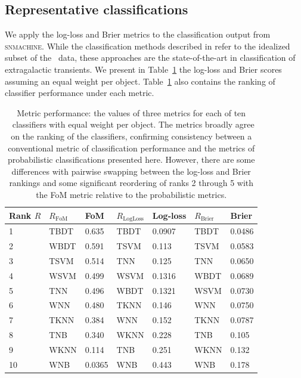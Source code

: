 \subsection{Representative classifications}
\label{sec:realresults}
We apply the log-loss and Brier metrics to the classification output from \textsc{snmachine}. While the classification methods described in \citet{lochner_photometric_2016} refer to the idealized subset of the \snphotcc\ data, these approaches are the state-of-the-art in classification of extragalactic transients. We present in Table~\ref{tab:snmachineresults} the log-loss and Brier scores assuming an equal weight per object. 
Table~\ref{tab:snmachineresults} also contains the ranking of classifier performance under each metric.


\begin{table}[]
	\begin{centering}
\begin{tabular}{lllllll}%
Rank $R$ & $R_\mathrm{FoM}$ & FoM & %
$R_\mathrm{LogLoss}$ & Log-loss & $R_\mathrm{Brier}$ & Brier \\
\hline
1  & TBDT & 0.635  %
& TBDT & 0.0907 & TBDT & 0.0486 \\
2  & WBDT & 0.591  %
& TSVM & 0.113  & TSVM & 0.0583 \\
3  & TSVM & 0.514  %
& TNN  & 0.125  & TNN  & 0.0650 \\
4  & WSVM & 0.499  %
& WSVM & 0.1316 & WBDT & 0.0689 \\
5  & TNN  & 0.496  %
& WBDT & 0.1321 & WSVM & 0.0730 \\
6  & WNN  & 0.480  %
& TKNN & 0.146  & WNN  & 0.0750 \\
7  & TKNN & 0.384  %
& WNN  & 0.152  & TKNN & 0.0787 \\
8  & TNB  & 0.340  %
& WKNN & 0.228  & TNB  & 0.105  \\
9  & WKNN & 0.114  %
& TNB  & 0.251  & WKNN & 0.132  \\
10 & WNB  & 0.0365 %
& WNB  & 0.443  & WNB  & 0.178  \\
\end{tabular}
	\caption{Metric performance: the values of three metrics for each of ten \snmachine\ classifiers with equal weight per object.
	The metrics broadly agree on the ranking of the classifiers, confirming consistency between a conventional metric of classification performance and the metrics of probabilistic classifications presented here.
	However, there are some differences with pairwise swapping between the log-loss and Brier rankings and some significant reordering of ranks 2 through 5 with the FoM metric relative to the probabilistic metrics.}
	\label{tab:snmachineresults}
	\end{centering}
\end{table}

